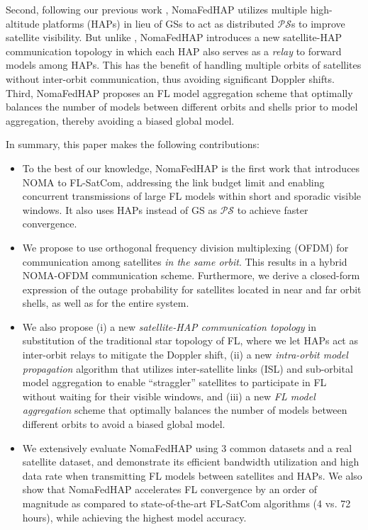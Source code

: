 \documentclass[letter,journal]{IEEEtran}
\begin{document}
Second, following our previous work \cite{happaper}, NomaFedHAP utilizes multiple high-altitude platforms (HAPs) in lieu of GSs to act as distributed $\mathcal {PS}$s to improve satellite visibility. But unlike \cite{happaper}, NomaFedHAP introduces a new satellite-HAP communication topology in which each HAP also serves as a {\em relay} to forward models among HAPs. This has the benefit of handling multiple orbits of satellites without inter-orbit communication, thus avoiding significant Doppler shifts. Third, NomaFedHAP proposes an FL model aggregation scheme that optimally balances the number of models between different orbits and shells prior to model aggregation, thereby avoiding a biased global model.

In summary, this paper makes the following contributions:
\begin{itemize}
    \item To the best of our knowledge, NomaFedHAP is the first work that introduces NOMA to FL-SatCom, addressing the link budget limit and enabling concurrent transmissions of large FL models within short and sporadic visible windows. It also uses HAPs instead of GS as $\mathcal {PS}$ to achieve faster convergence.

    \item We propose to use orthogonal frequency division multiplexing (OFDM) for communication among satellites {\em in the same orbit}. This results in a hybrid NOMA-OFDM communication scheme. Furthermore, we derive a closed-form expression of the outage probability for satellites located in near and far orbit shells, as well as for the entire system.
   
    \item We also propose (i) a new {\it satellite-HAP communication topology} in substitution of the traditional star topology of FL, where we let HAPs act as inter-orbit relays to mitigate the Doppler shift, (ii) a new \textit{intra-orbit model propagation} algorithm that utilizes inter-satellite links (ISL) and sub-orbital model aggregation to enable ``straggler'' satellites to participate in FL without waiting for their visible windows, and (iii) a new \textit{FL model aggregation} scheme that optimally balances the number of models between different orbits to avoid a biased global model.

    \item We extensively evaluate NomaFedHAP using 3 common datasets and a real satellite dataset, and demonstrate its efficient bandwidth utilization and high data rate when transmitting FL models between satellites and HAPs. We also show that NomaFedHAP accelerates FL convergence by an order of magnitude %
    as compared to state-of-the-art FL-SatCom algorithms (4 vs. 72 hours), while achieving the highest model accuracy.
\end{itemize}
\end{document}

